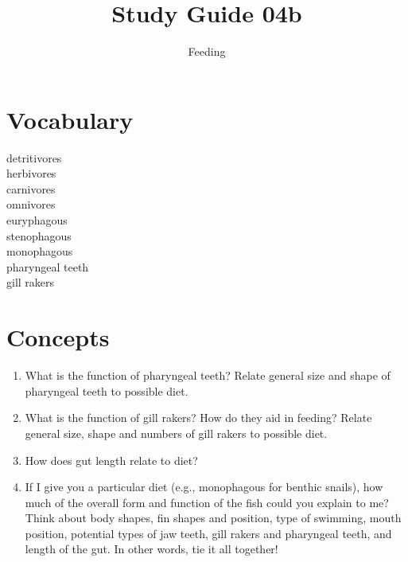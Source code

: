\documentclass[nofonts, letterpaper]{tufte-handout}
\title{Study Guide 04b}
\author{Feeding}
\date{} %
\begin{document}
\maketitle	%


\section{Vocabulary} 
\vspace{-1\baselineskip}
\begin{multicols}{2}
detritivores \\
herbivores \\
carnivores \\
omnivores \\
euryphagous \\
stenophagous \\
monophagous \\
pharyngeal teeth \\
gill rakers 
\end{multicols}

\section{Concepts}

\begin{enumerate}
	\item What is the function of pharyngeal teeth?  Relate general size and shape of pharyngeal teeth to possible diet.

	\item What is the function of gill rakers?  How do they aid in feeding?  Relate general size, shape and numbers of gill rakers to possible diet.

	\item How does gut length relate to diet?

	\item If I give you a particular diet (e.g., monophagous for benthic snails), how much of the overall form and function of the fish could you explain to me?  Think about body shapes, fin shapes and position, type of swimming, mouth position, potential types of jaw teeth, gill rakers and pharyngeal teeth, and length of the gut.  In other words, tie it all together!
\end{enumerate}
\end{document}
